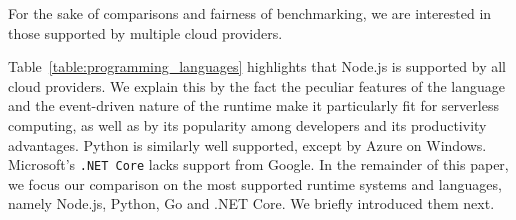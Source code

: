 For the sake of comparisons and fairness of benchmarking, we are interested in those supported by multiple cloud providers.  

Table~\ref{table:programming_languages} highlights that Node.js is supported by all cloud providers.
We explain this by the fact the peculiar features of the language and the event-driven nature of the runtime make it particularly fit for serverless computing, as well as by its popularity among developers and its productivity advantages.
Python is similarly well supported, except by Azure on Windows. %
Microsoft's \texttt{.NET Core} lacks support from Google. 
In the remainder of this paper, we focus our comparison on the most supported runtime systems and languages, namely Node.js, Python, Go and .NET Core.
We briefly introduced them next.

